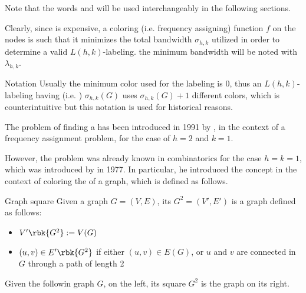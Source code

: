\documentclass[a4paper, 12pt]{report}
\begin{document}
    Note that the words  and  will be used interchangeably in the following sections.
    
    Clearly, since  is expensive, a  coloring (i.e. frequency assigning) function $f$ on the nodes is such that it minimizes the total bandwidth $\sigma_{h, k}$ utilized in order to determine a valid $L(h, k)$-labeling. the minimum bandwidth will be noted with $\lambda_{h, k}$.
    

    \begin{framedobs}{Notation}
        Usually the minimum color used for the labeling is 0, thus an $L(h, k)$-labeling having  (i.e. ) $\sigma_{h, k}(G)$ uses $\sigma_{h, k}(G) + 1$ different colors, which is counterintuitive but this notation is used for historical reasons.
    \end{framedobs}

    The problem of finding a  has been introduced in 1991 by \textcite{griggs}, in the context of a frequency assignment problem, for the case of $h = 2$ and $k = 1$.

    However, the problem was already known in combinatorics for the case $h = k = 1$, which was introduced by \textcite{wegner} in 1977. In particular, he introduced the concept in the context of coloring the  of a graph, which is defined as follows.

    \begin{frameddefn}{Graph square}
        Given a graph $G = (V, E)$, its  $G^2 = (V', E')$ is a graph defined as follows:
        
        \begin{itemize}
            \item $V'\rbk{G^2} := V(G)$
            \item $(u, v) \in E'\rbk{G^2}$ if either $(u, v) \in E(G)$, or $u$ and $v$ are connected in $G$ through a path of length 2
        \end{itemize}
    \end{frameddefn}

    \begin{example}
        Given the followin graph $G$, on the left, its square $G^2$ is the graph on its right.

    \end{example}
\end{document}
